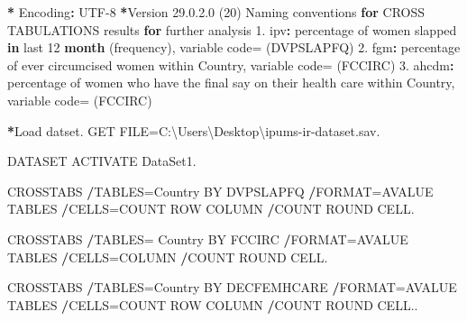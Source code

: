 \documentclass[
]{article}
\newenvironment{Shaded}{\begin{snugshade}}{\end{snugshade}}
\newcommand{\ControlFlowTok}[1]{\textcolor[rgb]{0.13,0.29,0.53}{\textbf{#1}}}
\newcommand{\DecValTok}[1]{\textcolor[rgb]{0.00,0.00,0.81}{#1}}
\newcommand{\FloatTok}[1]{\textcolor[rgb]{0.00,0.00,0.81}{#1}}
\newcommand{\FunctionTok}[1]{\textcolor[rgb]{0.13,0.29,0.53}{\textbf{#1}}}
\newcommand{\NormalTok}[1]{#1}
\newcommand{\OtherTok}[1]{\textcolor[rgb]{0.56,0.35,0.01}{#1}}
\newcommand{\SpecialCharTok}[1]{\textcolor[rgb]{0.81,0.36,0.00}{\textbf{#1}}}
\newcommand{\StringTok}[1]{\textcolor[rgb]{0.31,0.60,0.02}{#1}}
\begin{document}
\begin{Shaded}
\begin{Highlighting}[]
\SpecialCharTok{*}\NormalTok{ Encoding}\SpecialCharTok{:}\NormalTok{ UTF}\DecValTok{{-}8}
\SpecialCharTok{*}\NormalTok{Version }\DecValTok{29}\NormalTok{.}\DecValTok{0}\NormalTok{.}\FloatTok{2.0}\NormalTok{ (}\DecValTok{20}\NormalTok{)}
\NormalTok{Naming conventions }\ControlFlowTok{for}\NormalTok{ CROSS TABULATIONS results }\ControlFlowTok{for}\NormalTok{ further analysis}
\FloatTok{1.}\NormalTok{ ipv}\SpecialCharTok{:}\NormalTok{ percentage of women slapped }\ControlFlowTok{in}\NormalTok{ last }\DecValTok{12} \FunctionTok{month}\NormalTok{ (frequency), variable code}\OtherTok{=}\NormalTok{ (DVPSLAPFQ)}
\FloatTok{2.}\NormalTok{ fgm}\SpecialCharTok{:}\NormalTok{ percentage of ever circumcised women within Country, variable code}\OtherTok{=}\NormalTok{ (FCCIRC)}
\FloatTok{3.}\NormalTok{ ahcdm}\SpecialCharTok{:}\NormalTok{ percentage of women who have the final say on their health care within Country, variable code}\OtherTok{=}\NormalTok{ (FCCIRC)}


\SpecialCharTok{*}\NormalTok{Load datset.}
\NormalTok{ GET}
\NormalTok{  FILE}\OtherTok{=}\StringTok{\textquotesingle{}C:\textbackslash{}Users\textbackslash{}Desktop\textbackslash{}ipums{-}ir{-}dataset.sav\textquotesingle{}}\NormalTok{.}



\NormalTok{DATASET ACTIVATE DataSet1.}

\NormalTok{CROSSTABS}
  \SpecialCharTok{/}\NormalTok{TABLES}\OtherTok{=}\NormalTok{Country BY DVPSLAPFQ}
  \SpecialCharTok{/}\NormalTok{FORMAT}\OtherTok{=}\NormalTok{AVALUE TABLES}
  \SpecialCharTok{/}\NormalTok{CELLS}\OtherTok{=}\NormalTok{COUNT ROW COLUMN }
  \SpecialCharTok{/}\NormalTok{COUNT ROUND CELL.}


\NormalTok{CROSSTABS}
  \SpecialCharTok{/}\NormalTok{TABLES}\OtherTok{=}\NormalTok{ Country BY FCCIRC}
  \SpecialCharTok{/}\NormalTok{FORMAT}\OtherTok{=}\NormalTok{AVALUE TABLES}
  \SpecialCharTok{/}\NormalTok{CELLS}\OtherTok{=}\NormalTok{COLUMN }
  \SpecialCharTok{/}\NormalTok{COUNT ROUND CELL.}


\NormalTok{CROSSTABS}
  \SpecialCharTok{/}\NormalTok{TABLES}\OtherTok{=}\NormalTok{Country BY DECFEMHCARE}
  \SpecialCharTok{/}\NormalTok{FORMAT}\OtherTok{=}\NormalTok{AVALUE TABLES}
  \SpecialCharTok{/}\NormalTok{CELLS}\OtherTok{=}\NormalTok{COUNT ROW COLUMN }
  \SpecialCharTok{/}\NormalTok{COUNT ROUND CELL..}




\end{Highlighting}
\end{Shaded}
\end{document}
